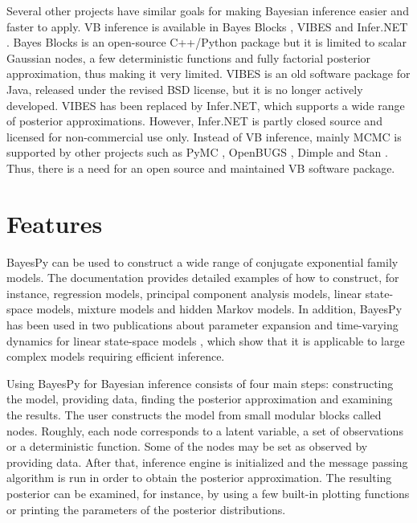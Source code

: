 \documentclass[twoside,11pt]{article}
\begin{document}
Several other projects have similar goals for making Bayesian inference easier
and faster to apply.  VB inference is available in Bayes Blocks
\citep{Raiko:2007}, VIBES \citep{Bishop:2002} and Infer.NET \citep{Infer.NET}.
Bayes Blocks is an open-source C++/Python package but it is limited to scalar
Gaussian nodes, a few deterministic functions and fully factorial posterior
approximation, thus making it very limited.  VIBES is an old software package
for Java, released under the revised BSD license, but it is no longer actively
developed.  VIBES has been replaced by Infer.NET, which supports a wide range of
posterior approximations.  However, Infer.NET is partly closed source and
licensed for non-commercial use only.  Instead of VB inference, mainly MCMC is
supported by other projects such as PyMC \citep{PyMC}, OpenBUGS \citep{OpenBUGS},
Dimple \citep{Dimple} and Stan \citep{Stan}.  Thus, there is a need for an open
source and maintained VB software package.



\section{Features}


BayesPy can be used to construct a wide range of conjugate exponential family
models.  The documentation provides detailed examples of how to construct, for
instance, regression models, principal component analysis models, linear
state-space models, mixture models and hidden Markov models.  In addition,
BayesPy has been used in two publications about parameter expansion and
time-varying dynamics for linear state-space models
\citep{Luttinen:2013,Luttinen:2014}, which show that it is applicable to large
complex models requiring efficient inference.



Using BayesPy for Bayesian inference consists of four main steps: constructing
the model, providing data, finding the posterior approximation and examining the
results.  The user constructs the model from small modular blocks called nodes.
Roughly, each node corresponds to a latent variable, a set of observations or a
deterministic function.  Some of the nodes may be set as observed by providing
data.  After that, inference engine is initialized and the message passing
algorithm is run in order to obtain the posterior approximation.  The resulting
posterior can be examined, for instance, by using a few built-in plotting
functions or printing the parameters of the posterior distributions.
\end{document}
